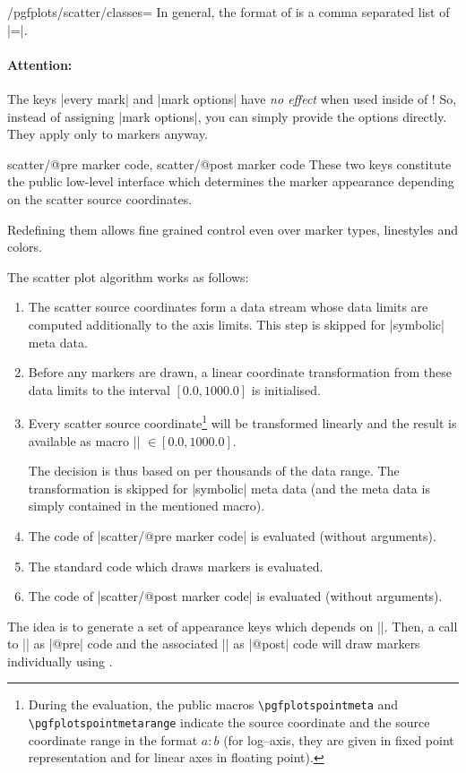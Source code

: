 \begin{stylekey}{/pgfplots/scatter/classes=}
In general, the format of  is a comma separated list of |=|.

\paragraph{Attention:} The keys |every mark| and |mark options| have \emph{no effect} when used inside of ! So, instead of assigning |mark options|, you can simply provide the options directly. They apply only to markers anyway.
\end{stylekey}

\begin{pgfplotsxycodekeylist}{
	scatter/@pre marker code,
	scatter/@post marker code}
	These two keys constitute the public low-level interface which determines the marker appearance depending on the scatter source coordinates.

	Redefining them allows fine grained control even over marker types, linestyles and colors.

	The scatter plot algorithm works as follows:
\begin{enumerate} 
\item The scatter source coordinates form a data stream whose data limits are computed additionally to the axis limits. This step is skipped for |symbolic| meta data.
\item Before any markers are drawn, a linear coordinate transformation from these data limits to the interval $[0.0,1000.0]$ is initialised. 
\item Every scatter source coordinate\footnote{During the evaluation, the public macros \texttt{\textbackslash pgfplotspointmeta} and \texttt{\textbackslash pgfplotspointmetarange} indicate the source coordinate and the source coordinate range in the format $a:b$ (for log--axis, they are given in fixed point representation and for linear axes in floating point).} will be transformed linearly and the result is available as macro |\pgfplotspointmetatransformed| $ \in [0.0,1000.0]$.

The decision is thus based on per thousands of the data range. The transformation is skipped for |symbolic| meta data (and the meta data is simply contained in the mentioned macro).
\item The code of |scatter/@pre marker code| is evaluated (without arguments).
\item The standard code which draws markers is evaluated.
\item The code of |scatter/@post marker code| is evaluated (without arguments).
\end{enumerate}
	The idea is to generate a set of appearance keys which depends on |\pgfplotspointmetatransformed|. Then, a call to |\scope| as |@pre| code and the associated |\endscope| as |@post| code will draw markers individually using .


\end{pgfplotsxycodekeylist}
